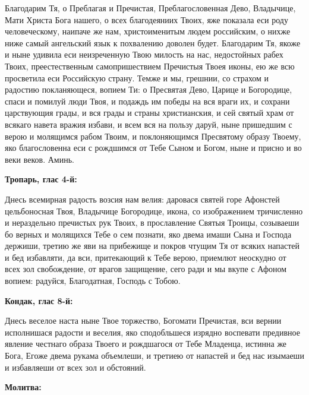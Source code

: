Благодарим Тя, о Преблагая и Пречистая, Преблагословенная Дево, Владычице, Мати Христа Бога нашего, о всех благодеяниих Твоих, яже показала еси роду человеческому, наипаче же нам, христоименитым людем российским, о нихже ниже самый ангельский язык к похвалению доволен будет. Благодарим Тя, якоже и ныне удивила еси неизреченную Твою милость на нас, недостойных рабех Твоих, преестественным самопришествием Пречистыя Твоея иконы, ею же всю просветила еси Российскую страну. Темже и мы, грешнии, со страхом и радостию покланяющеся, вопием Ти: о Пресвятая Дево, Царице и Богородице, спаси и помилуй люди Твоя, и подаждь им победы на вся враги их, и сохрани царствующия грады, и вся грады и страны христианския, и сей святый храм от всякаго навета вражия избави, и всем вся на пользу даруй, ныне пришедшим с верою и молящимся рабом Твоим, и поклоняющимся Пресвятому образу Твоему, яко благословенна еси с рождшимся от Тебе Сыном и Богом, ныне и присно и во веки веков. Аминь.
\nopagebreak\bigskip\bigskip\mychapterending

 


\bfseries Тропарь, глас 4-й:\normalfont{}\nopagebreak


Днесь всемирная радость возсия нам велия: даровася святей горе Афонстей цельбоносная Твоя, Владычице Богородице, икона, со изображением тричисленно и нераздельно пречистых рук Твоих, в прославление Святыя Троицы, созываеши бо верных и молящихся Тебе о сем познати, яко двема имаши Сына и Господа держиши, третию же яви на прибежище и покров чтущим Тя от всяких напастей и бед избавляти, да вси, притекающий к Тебе верою, приемлют неоскудно от всех зол свобождение, от врагов защищение, сего ради и мы вкупе с Афоном вопием: радуйся, Благодатная, Господь с Тобою. 


\medskip


\bfseries Кондак, глас 8-й:\normalfont{}\nopagebreak


Днесь веселое наста ныне Твое торжество, Богомати Пречистая, вси вернии исполнишася радости и веселия, яко сподобльшеся изрядно воспевати предивное явление честнаго образа Твоего и рождшагося от Тебе Младенца, истинна же Бога, Егоже двема рукама объемлеши, и третиею от напастей и бед нас изымаеши и избавляеши от всех зол и обстояний.


\medskip


\bfseries Молитва:\normalfont{}\nopagebreak


